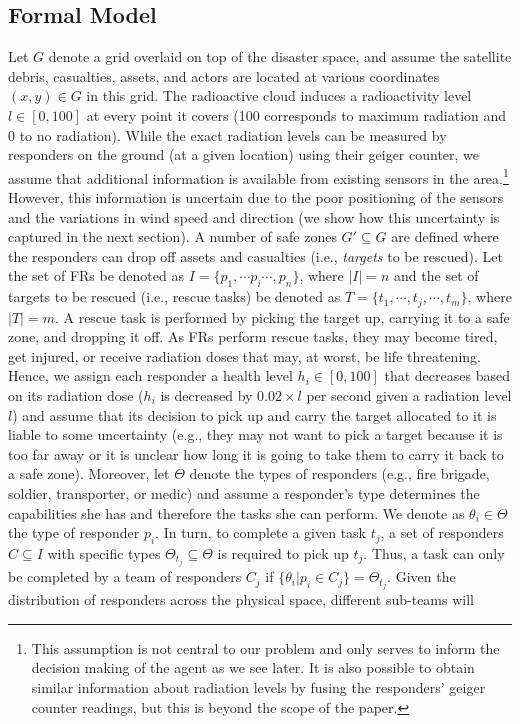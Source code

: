 
\subsection{Formal Model}\label{sec:model}
\noindent Let $G$ denote a grid overlaid on top of the disaster space, and assume the satellite debris, casualties, assets, and actors are located at various coordinates $(x,y) \in G$ in this grid. The radioactive cloud induces a radioactivity level  $l \in [0,100]$ at every point it covers (100 corresponds to maximum radiation and 0 to no radiation). While the exact radiation levels can be measured by responders on the ground (at a given location) using their geiger counter, we assume that additional information is available  from existing sensors  in the area.\footnote{This assumption is not central to our problem and only serves to inform the decision making of the agent as we see later. It is also possible to obtain similar information about radiation levels by fusing the responders' geiger counter readings, but this is beyond the scope of the paper.} However, this information is uncertain due to the poor positioning of the sensors and the variations in wind speed and direction (we show how this uncertainty is captured in the next section). A number of safe zones $G' \subseteq G$ are defined where the responders can drop off assets and casualties (i.e., \emph{targets} to be rescued). Let the set of FRs be denoted as $I = \{p_1, \cdots p_i \cdots, p_n\}$, where $|I| = n$ and the set of  targets to be rescued (i.e., rescue tasks) be denoted as  $T = \{t_1,\cdots, t_j, \cdots, t_m\}$, where $|T| = m$. A rescue task is performed by picking the target up, carrying it to a safe zone, and dropping it off.  As FRs perform rescue tasks, they may become tired, get injured, or receive radiation doses that may, at worst, be life threatening. Hence, we assign each responder  a health level $h_i\in [0,100]$ that decreases based on its radiation dose ($h_i$ is decreased by $0.02 \times l$ per second given a radiation level $l$) and assume that its decision to pick up and carry the target allocated to it is liable to some uncertainty (e.g., they may not want to pick a target because it is too far away or it is unclear how long it is going to take them to  carry it back  to a safe zone).  Moreover, let $\Theta$ denote the types of responders (e.g., fire brigade, soldier, transporter, or medic)  and assume a responder's type determines the capabilities  she has and therefore the tasks  she can perform. We denote as $\theta_i \in \Theta$ the type of responder $p_i$. In turn, to complete a given task $t_j$,  a set of responders $C \subseteq I$ with specific types $\Theta_{t_j} \subseteq \Theta$ is required to pick up $t_j$. Thus, a task can only be completed by a team of responders $C_j$ if $\{\theta_i | p_i \in C_j\} = \Theta_{t_j}$. Given the distribution of responders across the physical space, different sub-teams will 